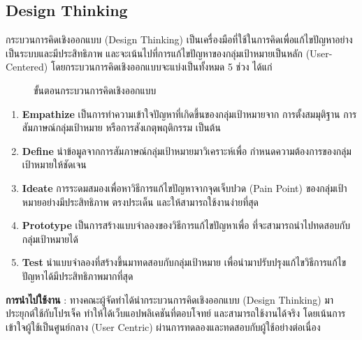 \subsection{Design Thinking}
กระบวนการคิดเชิงออกแบบ (Design Thinking)
เป็นเครื่องมือที่ใช้ในการคิดเพื่อแก้ไขปัญหาอย่างเป็นระบบและมีประสิทธิภาพ
และจะเน้นไปที่การแก้ไขปัญหาของกลุ่มเป้าหมายเป็นหลัก (User-Centered)
โดยกระบวนการคิดเชิงออกแบบจะแบ่งเป็นทั้งหมด 5 ช่วง ได้แก่
\begin{figure}[!h]\centering
      \setlength{\fboxrule}{0.2mm} %
      \setlength{\fboxsep}{0.5cm}
      \caption{ขั้นตอนกระบวนการคิดเชิงออกแบบ}\label{fig:design thinking}
\end{figure}
\begin{enumerate}
      \item \textbf{Empathize} เป็นการทำความเข้าใจปัญหาที่เกิดขึ้นของกลุ่มเป้าหมายจาก
            การตั้งสมมุติฐาน การสัมภาษณ์กลุ่มเป้าหมาย หรือการสังเกตุพฤติกรรม เป็นต้น
      \item \textbf{Define} นำข้อมูลจากการสัมภาษณ์กลุ่มเป้าหมายมาวิเคราะห์เพื่อ
            กำหนดความต้องการของกลุ่มเป้าหมายให้ชัดเจน
      \item \textbf{Ideate} การระดมสมองเพื่อหาวิธีการแก้ไขปัญหาจากจุดเจ็บปวด
            (Pain Point) ของกลุ่มเป้าหมายอย่างมีประสิทธิภาพ ตรงประเด็น
            และให้สามารถใช้งานง่ายที่สุด
      \item \textbf{Prototype} เป็นการสร้างแบบจำลองของวิธีการแก้ไขปัญหาเพื่อ
            ที่จะสามารถนำไปทดสอบกับกลุ่มเป้าหมายได้
      \item \textbf{Test} นำแบบจำลองที่สร้างขึ้นมาทดสอบกับกลุ่มเป้าหมาย
            เพื่อนำมาปรับปรุงแก้ไขวิธีการแก้ไขปัญหาได้มีประสิทธิภาพมากที่สุด
\end{enumerate}
\textbf{การนำไปใช้งาน} : ทางคณะผู้จัดทำได้นำกระบวนการคิดเชิงออกแบบ
(Design Thinking) มาประยุกต์ใช้กับโปรเจ็ค ทำให้ได้เว็บแอปพลิเคชันที่ตอบโจทย์
และสามารถใช้งานได้จริง โดยเน้นการเข้าใจผู้ใช้เป็นศูนย์กลาง (User Centric)
ผ่านการทดลองและทดสอบกับผู้ใช้อย่างต่อเนื่อง
